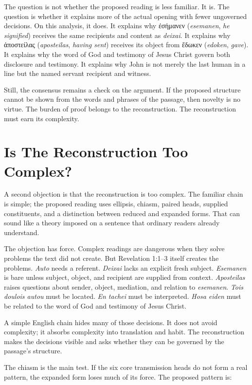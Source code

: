 The question is not whether the proposed reading is less familiar. It is. The question is whether it explains more of the actual opening with fewer ungoverned decisions. On this analysis, it does. It explains why \textgreek{ἐσήμανεν} (\textit{esemanen}, \textit{he signified}) receives the same recipients and content as \textit{deixai}. It explains why \textgreek{ἀποστείλας} (\textit{aposteilas}, \textit{having sent}) receives its object from \textgreek{ἔδωκεν} (\textit{edoken}, \textit{gave}). It explains why the word of God and testimony of Jesus Christ govern both disclosure and testimony. It explains why John is not merely the last human in a line but the named servant recipient and witness.

Still, the consensus remains a check on the argument. If the proposed structure cannot be shown from the words and phrases of the passage, then novelty is no virtue. The burden of proof belongs to the reconstruction. The reconstruction must earn its complexity.

\section{Is The Reconstruction Too Complex?}

A second objection is that the reconstruction is too complex. The familiar chain is simple; the proposed reading uses ellipsis, chiasm, paired heads, supplied constituents, and a distinction between reduced and expanded forms. That can sound like a theory imposed on a sentence that ordinary readers already understand.

The objection has force. Complex readings are dangerous when they solve problems the text did not create. But Revelation 1:1--3 itself creates the problems. \textit{Auto} needs a referent. \textit{Deixai} lacks an explicit fresh subject. \textit{Esemanen} is bare unless subject, object, and recipient are supplied from context. \textit{Aposteilas} raises questions about sender, object, mediation, and relation to \textit{esemanen}. \textit{Tois doulois autou} must be located. \textit{En tachei} must be interpreted. \textit{Hosa eiden} must be related to the word of God and testimony of Jesus Christ.

A simple English chain hides many of those decisions. It does not avoid complexity; it absorbs complexity into translation and habit. The reconstruction makes the decisions visible and asks whether they can be governed by the passage's structure.

The chiasm is the main test. If the six core transmission heads do not form a real pattern, the expanded form loses much of its force. The proposed pattern is:

